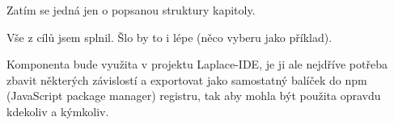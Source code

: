 
\begin{conclusion}
    Zatím se jedná jen o popsanou struktury kapitoly.

    Vše z cílů jsem splnil.
    Šlo by to i lépe (něco vyberu jako příklad).

    Komponenta bude využita v projektu Laplace-IDE, je ji ale nejdříve potřeba zbavit některých závislostí a exportovat jako samostatný balíček do npm (JavaScript package manager) registru, tak aby mohla být použita opravdu kdekoliv a kýmkoliv.

\end{conclusion}

